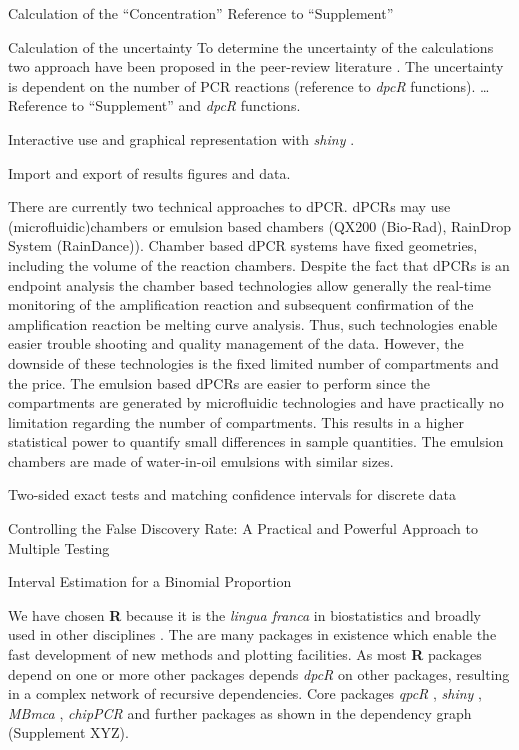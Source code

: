 \documentclass{bioinfo}
\begin{document}
Calculation of the ``Concentration''
Reference to ``Supplement''

Calculation of the uncertainty
To determine the uncertainty of the calculations two approach have been proposed 
in the peer-review literature \cite{dube_mathematical_2008, bhat_single_2009}. The uncertainty is 
dependent on the number of PCR reactions (reference to \textit{\textit{dpcR}} 
functions). … Reference to ``Supplement'' and \textit{dpcR} functions.



Interactive use and graphical representation with \textit{shiny} \cite{shiny}.

Import and export of results figures and data.

There are currently two technical approaches to dPCR. dPCRs may use		%
(microfluidic)chambers or emulsion based chambers 
(QX200 \texttrademark (Bio-Rad), RainDrop \texttrademark System (RainDance)). 
Chamber based dPCR systems have fixed geometries, including the volume of the 
reaction chambers. Despite the fact that dPCRs is an endpoint analysis the 
chamber based technologies allow generally the real-time monitoring of the 
amplification reaction and subsequent confirmation of the amplification reaction 
be melting curve analysis. Thus, such technologies enable easier trouble 
shooting and quality management of the data. However, the downside of these 
technologies is the fixed limited number of compartments and the price. The 
emulsion based dPCRs are easier to perform since the compartments are generated 
by microfluidic technologies and have practically no limitation regarding the 
number of compartments. This results in a higher statistical power to quantify 
small differences in sample quantities. The emulsion chambers are made of 
water-in-oil emulsions with similar sizes.


Two-sided exact tests and matching confidence intervals for discrete data \cite{fay_2010}

Controlling the False Discovery Rate: A Practical and Powerful Approach to Multiple Testing \cite{benjamini_1995}

Interval Estimation for a Binomial Proportion \cite{brown_2001}



We have chosen \textbf{R} because it is the \textit{lingua franca} in 
biostatistics and broadly used in other disciplines \cite{rodiger_r_2015}. The 
are many packages in existence which enable the fast development of new methods 
and plotting facilities. As most \textbf{R} packages depend on one or more other 
packages \cite{ooms_2013} depends \textit{dpcR} on other packages, resulting in 
a complex network of recursive dependencies. Core packages \textit{qpcR} 
\cite{ritz_qpcr_2008}, \textit{shiny} \cite{shiny}, \textit{MBmca} 
\cite{rodiger_surface_2013}, \textit{chipPCR} \cite{rodiger_chippcr_2015} and 
further packages as shown in the dependency graph (Supplement XYZ).
\end{document}
